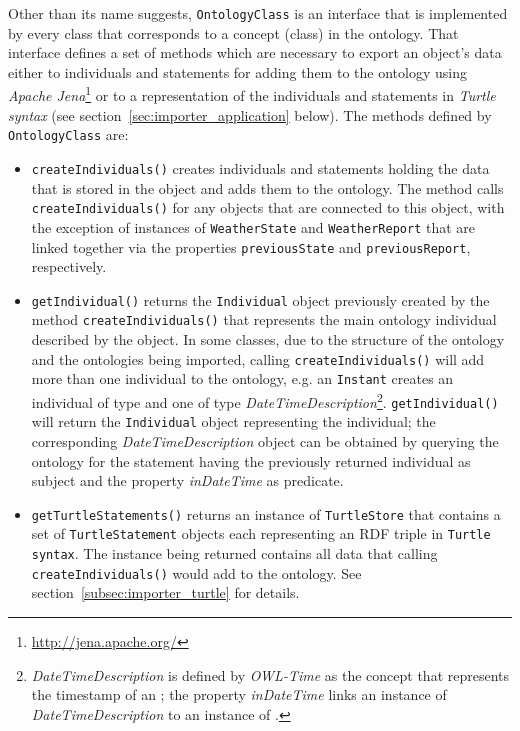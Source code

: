 Other than its name suggests, \texttt{OntologyClass} is an interface that is implemented by every class that corresponds to a concept (class) in the ontology. That interface defines a set of methods which are necessary to export an object's data either to individuals and statements for adding them to the ontology using \emph{Apache Jena}\footnote{\href{http://jena.apache.org/}{http://jena.apache.org/}} or to a representation of the individuals and statements in \emph{Turtle syntax} (see section~\ref{sec:importer_application} below). The methods defined by \texttt{OntologyClass} are:
\begin{itemize}
  \item \texttt{createIndividuals()} creates individuals and statements holding the data that is stored in the object and adds them to the ontology. The method calls \texttt{createIndividuals()} for any objects that are connected to this object, with the exception of instances of \texttt{WeatherState} and \texttt{WeatherReport} that are linked together via the properties \texttt{previousState} and \texttt{previousReport}, respectively.
  
  \item \texttt{getIndividual()} returns the \texttt{Individual} object previously created by the method \texttt{createIndividuals()} that represents the main ontology individual described by the object. In some classes, due to the structure of the \thinkhomeweather ontology and the ontologies being imported, calling \texttt{createIndividuals()} will add more than one individual to the ontology, e.g. an \texttt{Instant} creates an individual of type  and one of type \emph{DateTimeDescription}\footnote{\emph{DateTimeDescription} is defined by \emph{OWL-Time} as the concept that represents the timestamp of an ; the property \emph{inDateTime} links an instance of \emph{DateTimeDescription} to an instance of .}. \texttt{getIndividual()} will return the \texttt{Individual} object representing the  individual; the corresponding \emph{DateTimeDescription} object can be obtained by querying the ontology for the statement having the previously returned  individual as subject and the property \emph{inDateTime} as predicate.
  
  \item \texttt{getTurtleStatements()} returns an instance of \texttt{TurtleStore} that contains a set of \texttt{TurtleStatement} objects each representing an RDF triple in \texttt{Turtle syntax}. The instance being returned contains all data that calling \texttt{createIndividuals()} would add to the ontology. See section~\ref{subsec:importer_turtle} for details.
  

\end{itemize}
